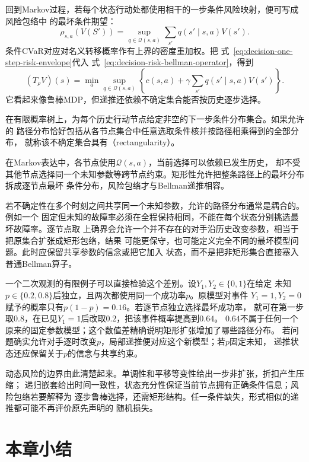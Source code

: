 回到Markov过程，若每个状态行动处都使用相干的一步条件风险映射，便可写成风险包络中
的最坏条件期望：
\begin{equation}
  \rho_{s,a}(V(S'))
  =
  \sup_{q\in\mathcal{Q}(s,a)}
  \sum_{s'}q(s'\mid s,a)V(s').
  \label{eq:decision-one-step-risk-envelope}
\end{equation}
条件CVaR对应对名义转移概率作有上界的密度重加权。把
式~\eqref{eq:decision-one-step-risk-envelope}代入
式~\eqref{eq:decision-risk-bellman-operator}，得到
\[
  (T_\rho V)(s)
  =
  \min_a
  \sup_{q\in\mathcal{Q}(s,a)}
  \left\{
    c(s,a)+\gamma\sum_{s'}q(s'\mid s,a)V(s')
  \right\}.
\]
它看起来像鲁棒MDP，但递推还依赖不确定集合能否按历史逐步选择。

\begin{definition}[条件分布集合的矩形性]
\label{def:decision-rectangular-uncertainty}
在有限概率树上，为每个历史行动节点给定非空的下一步条件分布集合。如果允许的
路径分布恰好包括从各节点集合中任意选取条件核并按路径相乘得到的全部分布，
就称该不确定集合具有（rectangularity）。
\end{definition}
在Markov表达中，各节点使用$\mathcal Q(s,a)$，当前选择可以依赖已发生历史，
却不受其他节点选择同一个未知参数等跨节点约束。矩形性允许把整条路径上的最坏分布拆成逐节点最坏
条件分布，风险包络才与Bellman递推相容。

若不确定性在多个时刻之间共享同一个未知参数，允许的路径分布通常是耦合的。例如一个
固定但未知的故障率必须在全程保持相同，不能在每个状态分别挑选最坏故障率。逐节点取
上确界会允许一个并不存在的对手沿历史改变参数，相当于把原集合扩张成矩形包络，结果
可能更保守，也可能定义完全不同的最坏模型问题。此时应保留共享参数的信念或把它加入
状态，而不是把非矩形集合直接塞入普通Bellman算子。

一个二次观测的有限例子可以直接检验这个差别。设$Y_1,Y_2\in\{0,1\}$在给定
未知$p\in\{0.2,0.8\}$后独立，且两次都使用同一个成功率$p$。原模型对事件
$Y_1=1,Y_2=0$赋予的概率只有$p(1-p)=0.16$。若逐节点独立选择最坏成功率，
就可在第一步取$0.8$，在已见$Y_1=1$后改取$0.2$，把该事件概率提高到$0.64$。
$0.64$不属于任何一个原来的固定参数模型；这个数值差精确说明矩形扩张增加了哪些路径分布。
若问题确实允许对手逐时改变$p$，局部递推便对应这个新模型；若$p$固定未知，
递推状态还应保留关于$p$的信念与共享约束。

动态风险的边界由此清楚起来。单调性和平移等变性给出一步非扩张，折扣产生压缩；
递归嵌套给出时间一致性，状态充分性保证当前节点拥有正确条件信息；风险包络若要解释为
逐步鲁棒选择，还需矩形结构。任一条件缺失，形式相似的递推都可能不再评价原先声明的
随机损失。

\section{本章小结}
\label{sec:decision-theory-and-dynamic-risk-summary}

